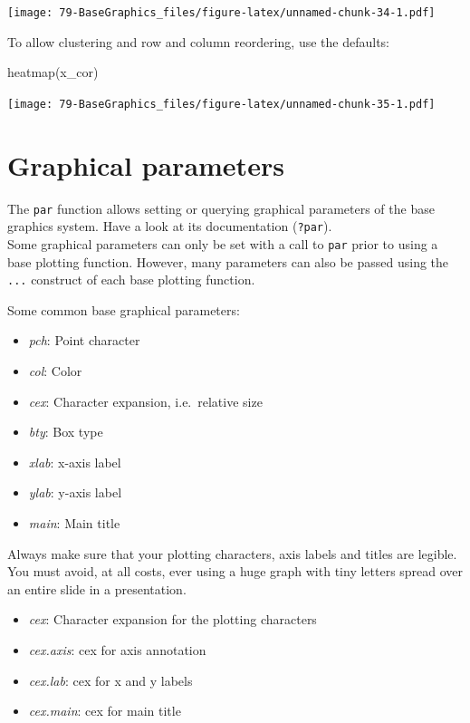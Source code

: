 \documentclass[
]{book}
\newenvironment{Shaded}{\begin{snugshade}}{\end{snugshade}}
\newcommand{\FunctionTok}[1]{\textcolor[rgb]{0.00,0.00,0.00}{#1}}
\newcommand{\NormalTok}[1]{#1}
\providecommand{\tightlist}{%
  \setlength{\itemsep}{0pt}\setlength{\parskip}{0pt}}
\begin{document}
\texttt{[image: 79-BaseGraphics\_files/figure-latex/unnamed-chunk-34-1.pdf]}

To allow clustering and row and column reordering, use the defaults:

\begin{Shaded}
\begin{Highlighting}[]
\FunctionTok{heatmap}\NormalTok{(x\_cor)}
\end{Highlighting}
\end{Shaded}

\texttt{[image: 79-BaseGraphics\_files/figure-latex/unnamed-chunk-35-1.pdf]}

\hypertarget{graphical-parameters}{%
\section{Graphical parameters}\label{graphical-parameters}}

The \texttt{par} function allows setting or querying graphical parameters of the base graphics system. Have a look at its documentation (\texttt{?par}).\\
Some graphical parameters can only be set with a call to \texttt{par} prior to using a base plotting function. However, many parameters can also be passed using the \texttt{...} construct of each base plotting function.

Some common base graphical parameters:

\begin{itemize}
\tightlist
\item
  \emph{pch}: Point character
\item
  \emph{col}: Color
\item
  \emph{cex}: Character expansion, i.e.~relative size
\item
  \emph{bty}: Box type
\item
  \emph{xlab}: x-axis label
\item
  \emph{ylab}: y-axis label
\item
  \emph{main}: Main title
\end{itemize}

Always make sure that your plotting characters, axis labels and titles are legible. You must avoid, at all costs, ever using a huge graph with tiny letters spread over an entire slide in a presentation.

\begin{itemize}
\tightlist
\item
  \emph{cex}: Character expansion for the plotting characters
\item
  \emph{cex.axis}: cex for axis annotation
\item
  \emph{cex.lab}: cex for x and y labels
\item
  \emph{cex.main}: cex for main title
\end{itemize}
\end{document}
